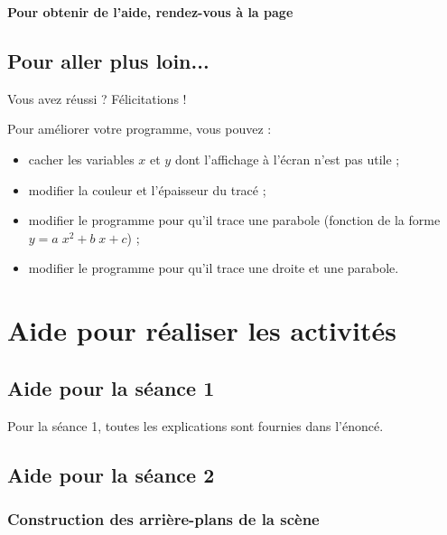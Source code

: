 
\textbf{Pour obtenir de l'aide, rendez-vous à la page \pageref{aide_seanceScratch3}}

\subsection{Pour aller plus loin...}

Vous avez réussi ? Félicitations !

\vspace{6pt}

Pour améliorer votre programme, vous pouvez :

\begin{itemize}
\item cacher les variables $x$ et $y$ dont l'affichage à l'écran n'est pas utile ;
\item modifier la couleur et l'épaisseur du tracé ; 
\item modifier le programme pour qu'il trace une parabole (fonction de la forme $y=a \; x^2 + b \; x + c$) ;
\item modifier le programme pour qu'il trace une droite et une parabole. 
\end{itemize}


\newpage

\section{Aide pour réaliser les activités}

\subsection{Aide pour la séance 1}

Pour la séance 1, toutes les explications sont fournies dans l'énoncé.

\subsection{Aide pour la séance 2}\label{aide_seanceScratch2}

\subsubsection{Construction des arrière-plans de la scène}

